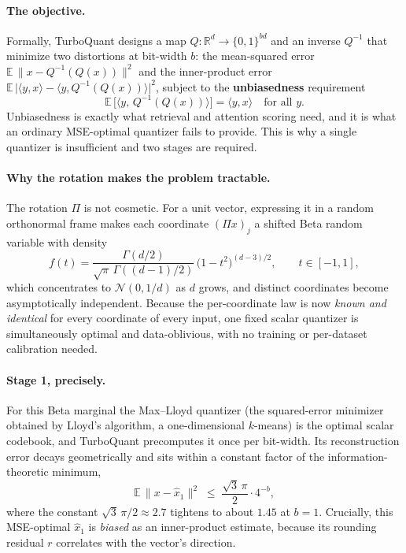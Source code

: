 \documentclass[11pt]{article}
\begin{document}
\paragraph{The objective.} Formally, TurboQuant designs a map $Q:\mathbb{R}^d \to \{0,1\}^{bd}$ and an inverse $Q^{-1}$ that minimize two distortions at bit-width $b$: the mean-squared error $\mathbb{E}\,\|x - Q^{-1}(Q(x))\|^2$ and the inner-product error $\mathbb{E}\,\bigl|\langle y, x\rangle - \langle y, Q^{-1}(Q(x))\rangle\bigr|^2$, subject to the \textbf{unbiasedness} requirement
\begin{equation}
\mathbb{E}\,\bigl[\langle y,\, Q^{-1}(Q(x))\rangle\bigr] = \langle y, x\rangle \quad \text{for all } y.
\end{equation}
Unbiasedness is exactly what retrieval and attention scoring need, and it is what an ordinary MSE-optimal quantizer fails to provide. This is why a single quantizer is insufficient and two stages are required.

\paragraph{Why the rotation makes the problem tractable.} The rotation $\Pi$ is not cosmetic. For a unit vector, expressing it in a random orthonormal frame makes each coordinate $(\Pi x)_j$ a shifted Beta random variable with density
\begin{equation}
f(t) = \frac{\Gamma(d/2)}{\sqrt{\pi}\,\Gamma\!\left((d-1)/2\right)}\,\bigl(1 - t^2\bigr)^{(d-3)/2}, \qquad t \in [-1, 1],
\end{equation}
which concentrates to $\mathcal{N}(0, 1/d)$ as $d$ grows, and distinct coordinates become asymptotically independent. Because the per-coordinate law is now \emph{known and identical} for every coordinate of every input, one fixed scalar quantizer is simultaneously optimal and data-oblivious, with no training or per-dataset calibration needed.

\paragraph{Stage 1, precisely.} For this Beta marginal the Max--Lloyd quantizer (the squared-error minimizer obtained by Lloyd's algorithm, a one-dimensional $k$-means) is the optimal scalar codebook, and TurboQuant precomputes it once per bit-width. Its reconstruction error decays geometrically and sits within a constant factor of the information-theoretic minimum,
\begin{equation}
\mathbb{E}\,\|x - \hat{x}_1\|^2 \;\le\; \frac{\sqrt{3}\,\pi}{2}\cdot 4^{-b},
\end{equation}
where the constant $\sqrt{3}\,\pi/2 \approx 2.7$ tightens to about $1.45$ at $b = 1$. Crucially, this MSE-optimal $\hat{x}_1$ is \emph{biased} as an inner-product estimate, because its rounding residual $r$ correlates with the vector's direction.
\end{document}
